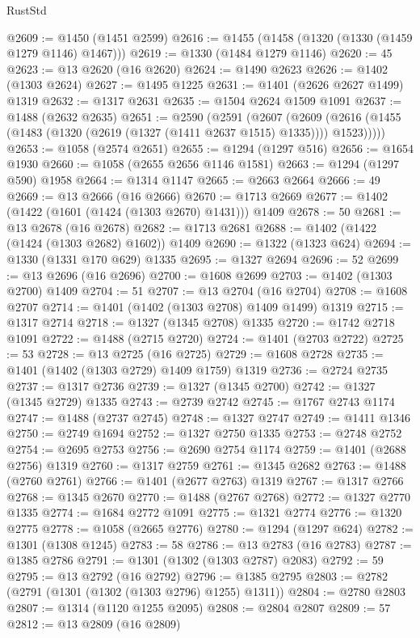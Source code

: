 \begin{lexlean}{RustStd}
\begin{coremodule}
@2609 := @1450 (@1451 @2599)
@2616 := @1455 (@1458 (@1320 (@1330 (@1459 @1279 @1146) @1467)))
@2619 := @1330 (@1484 @1279 @1146)
@2620 := 45
@2623 := @13 @2620 (@16 @2620)
@2624 := @1490 @2623
@2626 := @1402 (@1303 @2624)
@2627 := @1495 @1225
@2631 := @1401 (@2626 @2627 @1499) @1319
@2632 := @1317 @2631
@2635 := @1504 @2624 @1509 @1091
@2637 := @1488 (@2632 @2635)
@2651 := @2590
    (@2591
      (@2607
        (@2609 (@2616 (@1455 (@1483 (@1320 (@2619 (@1327 (@1411 @2637 @1515) @1335)))) @1523)))))
@2653 := @1058 (@2574 @2651)
@2655 := @1294 (@1297 @516)
@2656 := @1654 @1930
@2660 := @1058 (@2655 @2656 @1146 @1581)
@2663 := @1294 (@1297 @590) @1958
@2664 := @1314 @1147
@2665 := @2663 @2664
@2666 := 49
@2669 := @13 @2666 (@16 @2666)
@2670 := @1713 @2669
@2677 := @1402 (@1422 (@1601 (@1424 (@1303 @2670) @1431))) @1409
@2678 := 50
@2681 := @13 @2678 (@16 @2678)
@2682 := @1713 @2681
@2688 := @1402 (@1422 (@1424 (@1303 @2682) @1602)) @1409
@2690 := @1322 (@1323 @624)
@2694 := @1330 (@1331 @170 @629) @1335
@2695 := @1327 @2694
@2696 := 52
@2699 := @13 @2696 (@16 @2696)
@2700 := @1608 @2699
@2703 := @1402 (@1303 @2700) @1409
@2704 := 51
@2707 := @13 @2704 (@16 @2704)
@2708 := @1608 @2707
@2714 := @1401 (@1402 (@1303 @2708) @1409 @1499) @1319
@2715 := @1317 @2714
@2718 := @1327 (@1345 @2708) @1335
@2720 := @1742 @2718 @1091
@2722 := @1488 (@2715 @2720)
@2724 := @1401 (@2703 @2722)
@2725 := 53
@2728 := @13 @2725 (@16 @2725)
@2729 := @1608 @2728
@2735 := @1401 (@1402 (@1303 @2729) @1409 @1759) @1319
@2736 := @2724 @2735
@2737 := @1317 @2736
@2739 := @1327 (@1345 @2700)
@2742 := @1327 (@1345 @2729) @1335
@2743 := @2739 @2742
@2745 := @1767 @2743 @1174
@2747 := @1488 (@2737 @2745)
@2748 := @1327 @2747
@2749 := @1411 @1346
@2750 := @2749 @1694
@2752 := @1327 @2750 @1335
@2753 := @2748 @2752
@2754 := @2695 @2753
@2756 := @2690 @2754 @1174
@2759 := @1401 (@2688 @2756) @1319
@2760 := @1317 @2759
@2761 := @1345 @2682
@2763 := @1488 (@2760 @2761)
@2766 := @1401 (@2677 @2763) @1319
@2767 := @1317 @2766
@2768 := @1345 @2670
@2770 := @1488 (@2767 @2768)
@2772 := @1327 @2770 @1335
@2774 := @1684 @2772 @1091
@2775 := @1321 @2774
@2776 := @1320 @2775
@2778 := @1058 (@2665 @2776)
@2780 := @1294 (@1297 @624)
@2782 := @1301 (@1308 @1245)
@2783 := 58
@2786 := @13 @2783 (@16 @2783)
@2787 := @1385 @2786
@2791 := @1301 (@1302 (@1303 @2787) @2083)
@2792 := 59
@2795 := @13 @2792 (@16 @2792)
@2796 := @1385 @2795
@2803 := @2782 (@2791 (@1301 (@1302 (@1303 @2796) @1255) @1311))
@2804 := @2780 @2803
@2807 := @1314 (@1120 @1255 @2095)
@2808 := @2804 @2807
@2809 := 57
@2812 := @13 @2809 (@16 @2809)

\end{coremodule}
\end{lexlean}
